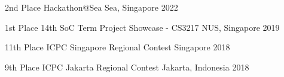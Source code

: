 

\begin{cvhonors}
  \cvhonor
    {2nd Place} %
    {Hackathon@Sea} %
    {Sea, Singapore} %
    {2022} %

  \cvhonor
    {1st Place} %
    {14th SoC Term Project Showcase - CS3217} %
    {NUS, Singapore} %
    {2019} %

  \cvhonor
    {11th Place} %
    {ICPC Singapore Regional Contest} %
    {Singapore} %
    {2018} %

  \cvhonor
    {9th Place} %
    {ICPC Jakarta Regional Contest} %
    {Jakarta, Indonesia} %
    {2018} %


\end{cvhonors}
